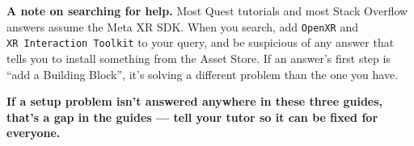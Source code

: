 \documentclass[11pt,a4paper]{article}
\begin{document}
\textbf{A note on searching for help.} Most Quest tutorials and most Stack Overflow answers
assume the Meta XR SDK. When you search, add \texttt{OpenXR} and \texttt{XR\ Interaction\ Toolkit} to your
query, and be suspicious of any answer that tells you to install something from the Asset
Store. If an answer's first step is ``add a Building Block'', it's solving a different
problem than the one you have.

\textbf{If a setup problem isn't answered anywhere in these three guides, that's a gap in the
guides --- tell your tutor so it can be fixed for everyone.}
\end{document}
